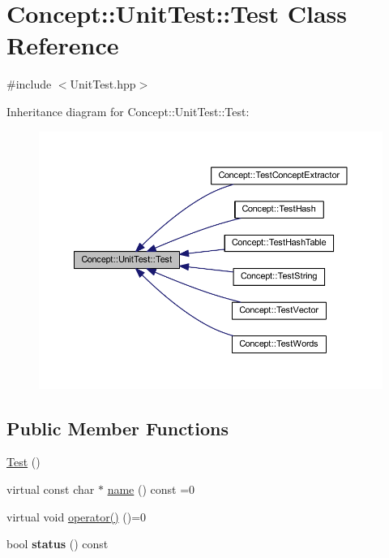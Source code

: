 \hypertarget{class_concept_1_1_unit_test_1_1_test}{}\section{Concept\+::Unit\+Test\+::Test Class Reference}
\label{class_concept_1_1_unit_test_1_1_test}


{\ttfamily \#include $<$Unit\+Test.\+hpp$>$}



Inheritance diagram for Concept\+::Unit\+Test\+::Test\+:\nopagebreak
\begin{figure}[H]
\begin{center}
\leavevmode
\includegraphics[width=350pt]{class_concept_1_1_unit_test_1_1_test__inherit__graph}
\end{center}
\end{figure}
\subsection*{Public Member Functions}
\begin{DoxyCompactItemize}
\item 
\mbox{\hyperlink{class_concept_1_1_unit_test_1_1_test_a29ca1a5654e3fe0a8911a21a5c2e0dce}{Test}} ()
\item 
virtual const char $\ast$ \mbox{\hyperlink{class_concept_1_1_unit_test_1_1_test_a28c0cddd9719cd456fa92a142ae6c59d}{name}} () const =0
\item 
virtual void \mbox{\hyperlink{class_concept_1_1_unit_test_1_1_test_aa8c081714f642696eeef640911be752a}{operator()}} ()=0
\item 
\mbox{\label{class_concept_1_1_unit_test_1_1_test_ab9220ef5e17da881b906ef89238b58af}} 
bool {\bfseries status} () const
\end{DoxyCompactItemize}
